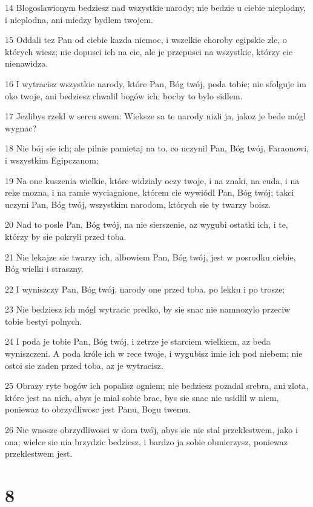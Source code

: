 \par 14 Blogoslawionym bedziesz nad wszystkie narody; nie bedzie u ciebie nieplodny, i nieplodna, ani miedzy bydlem twojem.
\par 15 Oddali tez Pan od ciebie kazda niemoc, i wszelkie choroby egipskie zle, o których wiesz; nie dopusci ich na cie, ale je przepusci na wszystkie, którzy cie nienawidza.
\par 16 I wytracisz wszystkie narody, które Pan, Bóg twój, poda tobie; nie sfolguje im oko twoje, ani bedziesz chwalil bogów ich; bocby to bylo sidlem.
\par 17 Jezlibys rzekl w sercu swem: Wieksze sa te narody nizli ja, jakoz je bede mógl wygnac?
\par 18 Nie bój sie ich; ale pilnie pamietaj na to, co uczynil Pan, Bóg twój, Faraonowi, i wszystkim Egipczanom;
\par 19 Na one kuszenia wielkie, które widzialy oczy twoje, i na znaki, na cuda, i na reke mozna, i na ramie wyciagnione, którem cie wywiódl Pan, Bóg twój; takci uczyni Pan, Bóg twój, wszystkim narodom, których sie ty twarzy boisz.
\par 20 Nad to posle Pan, Bóg twój, na nie sierszenie, az wygubi ostatki ich, i te, którzy by sie pokryli przed toba.
\par 21 Nie lekajze sie twarzy ich, albowiem Pan, Bóg twój, jest w posrodku ciebie, Bóg wielki i straszny.
\par 22 I wyniszczy Pan, Bóg twój, narody one przed toba, po lekku i po trosze;
\par 23 Nie bedziesz ich mógl wytracic predko, by sie snac nie namnozylo przeciw tobie bestyi polnych.
\par 24 I poda je tobie Pan, Bóg twój, i zetrze je starciem wielkiem, az beda wyniszczeni. A poda króle ich w rece twoje, i wygubisz imie ich pod niebem; nie ostoi sie zaden przed toba, az je wytracisz.
\par 25 Obrazy ryte bogów ich popalisz ogniem; nie bedziesz pozadal srebra, ani zlota, które jest na nich, abys je mial sobie brac, bys sie snac nie usidlil w niem, poniewaz to obrzydliwosc jest Panu, Bogu twemu.
\par 26 Nie wnosze obrzydliwosci w dom twój, abys sie nie stal przeklestwem, jako i ona; wielce sie nia brzydzic bedziesz, i bardzo ja sobie obmierzysz, poniewaz przeklestwem jest.

\chapter{8}

